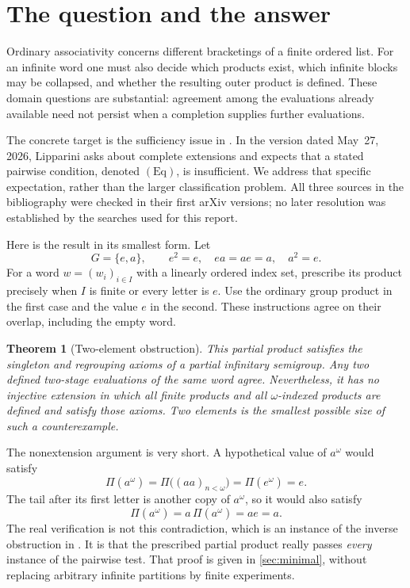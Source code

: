 \documentclass[11pt,letterpaper]{article}
\numberwithin{equation}{section}
\newtheorem{theorem}{Theorem}[section]
\theoremstyle{definition}
\theoremstyle{remark}
\newcommand{\Eq}{\mathrm{Eq}}
\newcommand{\set}[1]{\{#1\}}
\begin{document}
\tableofcontents
\newpage
{}

\section{The question and the answer}
\label{sec:question}
Ordinary associativity concerns different bracketings of a finite ordered list. For an infinite word one must also decide which products exist, which infinite blocks may be collapsed, and whether the resulting outer product is defined. These domain questions are substantial: agreement among the evaluations already available need not persist when a completion supplies further evaluations.

The concrete target is the sufficiency issue in \cite[Remark~7.1(b)]{LippariniNIS}. In the version dated May~27, 2026, Lipparini asks about complete extensions and expects that a stated pairwise condition, denoted $(\Eq)$, is insufficient. We address that specific expectation, rather than the larger classification problem. All three sources in the bibliography were checked in their first arXiv versions; no later resolution was established by the searches used for this report.

Here is the result in its smallest form. Let
\[
G=\set{e,a},\qquad e^2=e,\quad ea=ae=a,\quad a^2=e.
\]
For a word $w=(w_i)_{i\in I}$ with a linearly ordered index set, prescribe its product precisely when $I$ is finite or every letter is $e$. Use the ordinary group product in the first case and the value $e$ in the second. These instructions agree on their overlap, including the empty word.

\begin{theorem}[Two-element obstruction]\label{thm:main}
This partial product satisfies the singleton and regrouping axioms of a partial infinitary semigroup. Any two defined two-stage evaluations of the same word agree. Nevertheless, it has no injective extension in which all finite products and all $\omega$-indexed products are defined and satisfy those axioms. Two elements is the smallest possible size of such a counterexample.
\end{theorem}

The nonextension argument is very short. A hypothetical value of $a^\omega$ would satisfy
\[
\Pi(a^\omega)=\Pi\bigl((aa)_{n<\omega}\bigr)
             =\Pi(e^\omega)=e.
\]
The tail after its first letter is another copy of $a^\omega$, so it would also satisfy
\[
\Pi(a^\omega)=a\,\Pi(a^\omega)=ae=a.
\]
The real verification is not this contradiction, which is an instance of the inverse obstruction in \cite[Proposition~5.1]{LippariniNIS}. It is that the prescribed partial product really passes \emph{every} instance of the pairwise test. That proof is given in \cref{sec:minimal}, without replacing arbitrary infinite partitions by finite experiments.
\end{document}
